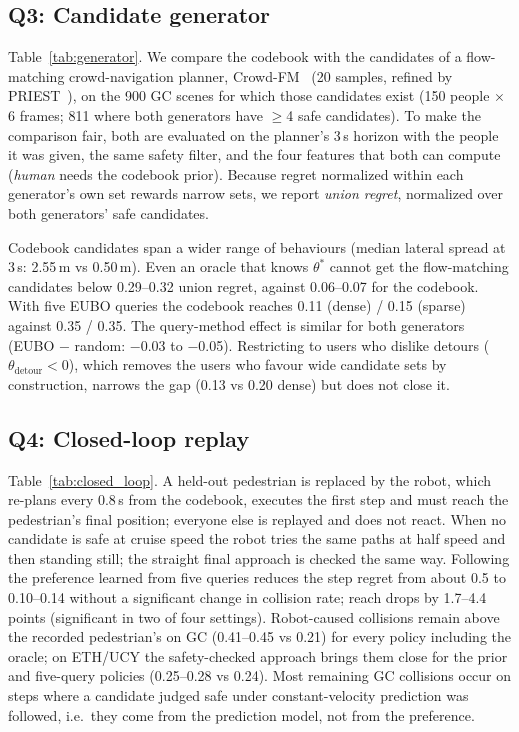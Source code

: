 \subsection{Q3: Candidate generator}
Table~\ref{tab:generator}. We compare the codebook with the candidates of a flow-matching crowd-navigation planner,
Crowd-FM~\citep{singha2026crowdfm} (20 samples, refined by PRIEST~\citep{rastgar2024priest}), on the 900 GC scenes for which those candidates exist
(150 people $\times$ 6 frames; 811 where both generators have $\ge$4 safe candidates). To make the comparison fair, both are evaluated on
the planner's 3\,s horizon with the people it was given, the same safety filter, and the four features that both can compute
(\emph{human} needs the codebook prior). Because regret normalized within each generator's own set rewards narrow sets, we report
\emph{union regret}, normalized over both generators' safe candidates.

Codebook candidates span a wider range of behaviours (median lateral spread at 3\,s: 2.55\,m vs 0.50\,m). Even an oracle that knows
$\theta^\ast$ cannot get the flow-matching candidates below 0.29--0.32 union regret, against 0.06--0.07 for the codebook. With five EUBO
queries the codebook reaches 0.11 (dense) / 0.15 (sparse) against 0.35 / 0.35. The query-method effect is similar for both generators
(EUBO $-$ random: $-$0.03 to $-$0.05). Restricting to users who dislike detours ($\theta_{\text{detour}}<0$), which removes the users
who favour wide candidate sets by construction, narrows the gap (0.13 vs 0.20 dense) but does not close it.



\subsection{Q4: Closed-loop replay}
Table~\ref{tab:closed_loop}. A held-out pedestrian is replaced by the robot, which re-plans every 0.8\,s from the codebook, executes
the first step and must reach the pedestrian's final position; everyone else is replayed and does not react. When no candidate is safe
at cruise speed the robot tries the same paths at half speed and then standing still; the straight final approach is checked the same way.
Following the preference learned from five queries reduces the step regret from about 0.5 to 0.10--0.14 without a significant change in
collision rate; reach drops by 1.7--4.4 points (significant in two of four settings).
Robot-caused collisions remain above the recorded pedestrian's on GC (0.41--0.45 vs 0.21) for every policy including the oracle;
on ETH/UCY the safety-checked approach brings them close for the prior and five-query policies (0.25--0.28 vs 0.24). Most remaining GC collisions occur on steps where a
candidate judged safe under constant-velocity prediction was followed, i.e.\ they come from the prediction model, not from the preference.


